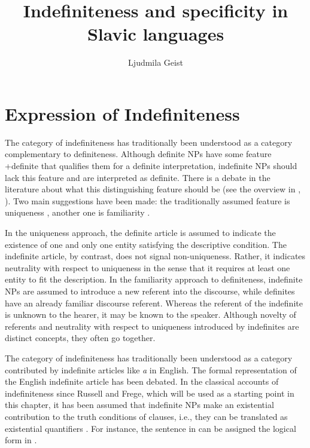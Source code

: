 \documentclass[output=paper,colorlinks,citecolor=brown]{langscibook}
\author{Ljudmila Geist\orcid{0000-0001-7907-4958}\affiliation{University of Stuttgart}}
\title{Indefiniteness and specificity in Slavic languages}
\begin{document}
\maketitle

% 


\section{Expression of Indefiniteness}

The category of indefiniteness has traditionally been understood as a category complementary to definiteness. Although definite NPs have some feature +definite that qualifies them for a definite interpretation, indefinite NPs should lack this feature and are interpreted as {\textminus}definite. There is a debate in the literature about what this distinguishing feature should be (see the overview in \citealt{Abbott2006,Heim2011,Brasoveanu.Farkas2016}, ). Two main suggestions have been made: the traditionally assumed feature is uniqueness \citep{Russell1905,Roberts2003}, another one is familiarity \citep{Christophersen1939,Kamp1981,Heim1982}.

In the uniqueness approach, the definite article is assumed to indicate the existence of one and only one entity satisfying the descriptive condition. The indefinite article, by contrast, does not signal non-uniqueness. Rather, it indicates neutrality with respect to uniqueness in the sense that it requires at least one entity to fit the description. In the familiarity approach to definiteness, indefinite NPs are assumed to introduce a new referent into the discourse, while definites have an already familiar discourse referent. Whereas the referent of the indefinite is unknown to the hearer, it may be known to the speaker. Although novelty of referents and neutrality with respect to uniqueness introduced by indefinites are distinct concepts, they often go together.

The category of indefiniteness has traditionally been understood as a category contributed by indefinite articles like \textit{a} in English. The formal representation of the English indefinite article has been debated. In the classical accounts of indefiniteness since Russell and Frege, which will be used as a starting point in this chapter, it has been assumed that indefinite NPs make an existential contribution to the truth conditions of clauses, i.e., they can be translated as existential quantifiers \citep{Russell1905}. For instance, the sentence in  can be assigned the logical form in .
\end{document}

